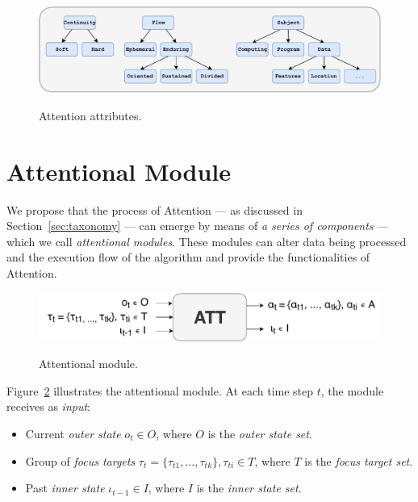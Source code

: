 \documentclass[11pt]{article}
\begin{document}
\begin{figure}[H]
    \centering
    \includegraphics[width=1.0\linewidth]{./img/taxonomy.pdf}\label{fig:taxonomy}
    \caption{Attention attributes.}
\end{figure}

%

\section{Attentional Module}
We propose that the process of Attention --- as discussed in Section~\ref{sec:taxonomy}  --- can emerge by means of \emph{a series of components} --- which we call \emph{attentional modules}. These modules can alter data being processed and the execution flow of the algorithm and provide the functionalities of Attention.

\begin{figure}[H]
    \centering
    \includegraphics[width=0.9\linewidth]{./img/alt_att_block.pdf}\label{fig:attmodule}
    \caption{Attentional module.}
\end{figure}

Figure~\ref{fig:attmodule} illustrates the attentional module. At each time step $t$, the module receives as \emph{input}:
\begin{itemize}
    \item Current \emph{outer state} $o_t \in O$, where $O$ is the \emph{outer state set}.
    \item Group of \emph{focus targets} $\tau_t = \{\tau_{t1}, \ldots, \tau_{tk}\}, \tau_{ti} \in T$,
        where $T$ is the \emph{focus target set}.
    \item Past \emph{inner state} $\iota_{t-1} \in I$, where $I$ is the \emph{inner state set}.
\end{itemize}
\end{document}
